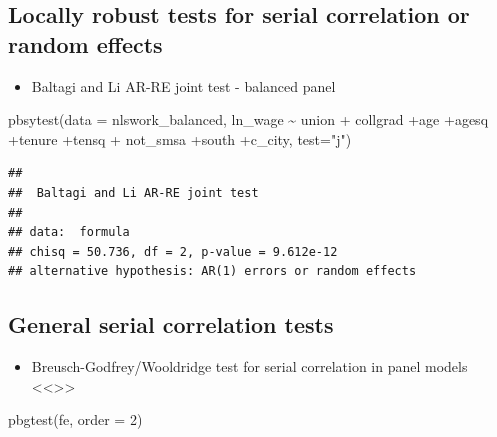 \documentclass[
]{article}
\newenvironment{Shaded}{\begin{snugshade}}{\end{snugshade}}
\newcommand{\AttributeTok}[1]{\textcolor[rgb]{0.77,0.63,0.00}{#1}}
\newcommand{\DecValTok}[1]{\textcolor[rgb]{0.00,0.00,0.81}{#1}}
\newcommand{\FunctionTok}[1]{\textcolor[rgb]{0.00,0.00,0.00}{#1}}
\newcommand{\NormalTok}[1]{#1}
\newcommand{\SpecialCharTok}[1]{\textcolor[rgb]{0.00,0.00,0.00}{#1}}
\newcommand{\StringTok}[1]{\textcolor[rgb]{0.31,0.60,0.02}{#1}}
\providecommand{\tightlist}{%
  \setlength{\itemsep}{0pt}\setlength{\parskip}{0pt}}
\begin{document}
\hypertarget{locally-robust-tests-for-serial-correlation-or-random-effects}{%
\subsection{Locally robust tests for serial correlation or random
effects}\label{locally-robust-tests-for-serial-correlation-or-random-effects}}

\begin{itemize}
\tightlist
\item
  Baltagi and Li AR-RE joint test - balanced panel
\end{itemize}

\begin{Shaded}
\begin{Highlighting}[]
  \FunctionTok{pbsytest}\NormalTok{(}\AttributeTok{data =}\NormalTok{ nlswork\_balanced, ln\_wage }\SpecialCharTok{\textasciitilde{}}\NormalTok{ union }\SpecialCharTok{+}
\NormalTok{             collgrad }\SpecialCharTok{+}\NormalTok{age }\SpecialCharTok{+}\NormalTok{agesq }\SpecialCharTok{+}\NormalTok{tenure }\SpecialCharTok{+}\NormalTok{tensq }\SpecialCharTok{+}
\NormalTok{             not\_smsa }\SpecialCharTok{+}\NormalTok{south }\SpecialCharTok{+}\NormalTok{c\_city, }\AttributeTok{test=}\StringTok{"j"}\NormalTok{)}
\end{Highlighting}
\end{Shaded}

\begin{verbatim}
## 
##  Baltagi and Li AR-RE joint test
## 
## data:  formula
## chisq = 50.736, df = 2, p-value = 9.612e-12
## alternative hypothesis: AR(1) errors or random effects
\end{verbatim}

\hypertarget{general-serial-correlation-tests}{%
\subsection{General serial correlation
tests}\label{general-serial-correlation-tests}}

\begin{itemize}
\tightlist
\item
  Breusch-Godfrey/Wooldridge test for serial correlation in panel models
  \textless\textless\textgreater\textgreater{}
\end{itemize}

\begin{Shaded}
\begin{Highlighting}[]
\FunctionTok{pbgtest}\NormalTok{(fe, }\AttributeTok{order =} \DecValTok{2}\NormalTok{)}
\end{Highlighting}
\end{Shaded}
\end{document}
